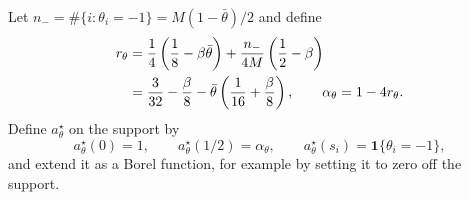 \documentclass[11pt]{article}
\theoremstyle{remark}
\newcommand{\ind}{\mathbf 1}
\begin{document}
Let $n_-=\#\{i:\theta_i=-1\}=M(1-\bar\theta)/2$ and define
\begin{align}
 r_\theta
 &=\frac14\left(\frac18-\beta\bar\theta\right)
   +\frac{n_-}{4M}\left(\frac12-\beta\right)\notag\\
 &=\frac3{32}-\frac\beta8
   -\bar\theta\left(\frac1{16}+\frac\beta8\right),
 \qquad \alpha_\theta=1-4r_\theta.
 \label{eq:boundary-mix}
\end{align}
Define $a^\star_\theta$ on the support by
\begin{equation}
 a^\star_\theta(0)=1,\qquad
 a^\star_\theta(1/2)=\alpha_\theta,\qquad
 a^\star_\theta(s_i)=\ind\{\theta_i=-1\},
 \label{eq:comparator}
\end{equation}
and extend it as a Borel function, for example by setting it to zero off
the support.
\end{document}
